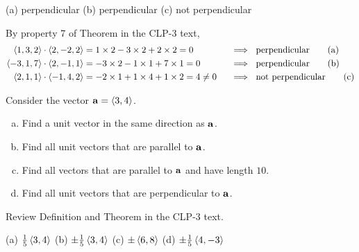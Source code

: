 \begin{answer}
(a) perpendicular\qquad
(b) perpendicular\qquad
(c) not perpendicular
\end{answer}

\begin{solution}
\leqnomode
By property 7 of Theorem  in the CLP-3 text,
\begin{alignat*}{3}
\llt 1,3,2\rgt \cdot\llt 2,-2,2\rgt 
&=1\times2-3\times 2+2\times2=0\ 
&&\implies\ \text{perpendicular}
\tag{a} \\
\llt -3,1,7\rgt \cdot\llt 2,-1,1\rgt 
&=-3\times2-1\times 1+7\times1=0\ 
&&\implies\ \text{perpendicular}
\tag{b} \\
\llt 2,1,1\rgt \cdot\llt -1,4,2\rgt 
&=-2\times1+1\times 4+1\times2=4\ne 0\ 
&&\implies\ \text{not perpendicular}
\tag{c}
\end{alignat*}
\reqnomode
\end{solution}


\begin{question}
Consider the vector $\mathbf{a}=\left< 3,4 \right>$.
\begin{enumerate}[(a)]
\item
Find a unit vector in the same direction as $\mathbf{a}$. 
\item
Find all unit vectors that are parallel to $\mathbf{a}$.
\item
Find all vectors that are parallel to $\mathbf{a}$ and have length $10$.
\item
Find all unit vectors that are perpendicular to $\mathbf{a}$.
\end{enumerate}
\end{question}

\begin{hint}
Review Definition  and 
Theorem  in the CLP-3 text.
\end{hint}

\begin{answer}
(a) $\frac{1}{5}\left< 3,4 \right>$\quad
(b) $\pm\frac{1}{5}\left< 3,4 \right>$\quad
(c) $\pm \left< 6,8 \right>$\quad
(d) $\pm\frac{1}{5}\left< 4,-3 \right>$
\end{answer}

